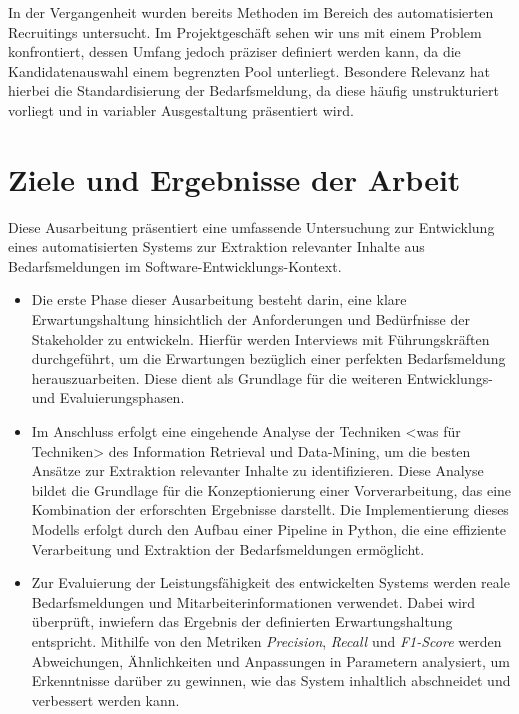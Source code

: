 \documentclass[a4paper,12pt]{scrreprt}
\newcommand{\hiddenchapter}[1]{
	\chapter*{{#1}}
}
\begin{document}
In der Vergangenheit wurden bereits Methoden im Bereich des automatisierten Recruitings untersucht. Im Projektgeschäft sehen wir uns mit einem Problem konfrontiert, dessen Umfang jedoch präziser definiert werden kann, da die Kandidatenauswahl einem begrenzten Pool unterliegt. Besondere Relevanz hat hierbei die Standardisierung der Bedarfsmeldung, da diese häufig unstrukturiert vorliegt und in variabler Ausgestaltung präsentiert wird.
\hiddenchapter{Ziele und Ergebnisse der Arbeit}
Diese Ausarbeitung präsentiert eine umfassende Untersuchung zur Entwicklung eines automatisierten Systems zur Extraktion relevanter Inhalte aus Bedarfsmeldungen im Software-Entwicklungs-Kontext.
\begin{itemize}
	\item Die erste Phase dieser Ausarbeitung besteht darin, eine klare Erwartungshaltung hinsichtlich der Anforderungen und Bedürfnisse der Stakeholder zu entwickeln. Hierfür werden Interviews mit Führungskräften durchgeführt, um die Erwartungen bezüglich einer \glqq{}perfekten\grqq{} Bedarfsmeldung herauszuarbeiten. Diese dient als Grundlage für die weiteren Entwicklungs- und Evaluierungsphasen.
	\item Im Anschluss erfolgt eine eingehende Analyse der Techniken <was für Techniken> des Information Retrieval und Data-Mining, um die besten Ansätze zur Extraktion relevanter Inhalte zu identifizieren. Diese Analyse bildet die Grundlage für die Konzeptionierung einer Vorverarbeitung, das eine Kombination der erforschten Ergebnisse darstellt. Die Implementierung dieses Modells erfolgt durch den Aufbau einer Pipeline in Python, die eine effiziente Verarbeitung und Extraktion der Bedarfsmeldungen ermöglicht.
	\item Zur Evaluierung der Leistungsfähigkeit des entwickelten Systems werden reale Bedarfsmeldungen und Mitarbeiterinformationen verwendet. Dabei wird überprüft, inwiefern das Ergebnis der definierten Erwartungshaltung entspricht. Mithilfe von den Metriken \emph{Precision}, \emph{Recall} und \emph{F1-Score} werden Abweichungen, Ähnlichkeiten und Anpassungen in Parametern analysiert, um Erkenntnisse darüber zu gewinnen, wie das System inhaltlich abschneidet und verbessert werden kann.
\end{itemize}
\end{document}

